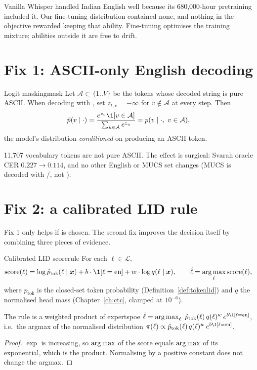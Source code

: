 \begin{intuition}
Vanilla Whisper handled Indian English well because its 680{,}000-hour pretraining included it. Our fine-tuning distribution
contained none, and nothing in the objective rewarded keeping that ability. Fine-tuning optimises the training mixture; abilities
outside it are free to drift.
\end{intuition}

\section{Fix 1: ASCII-only English decoding}

\begin{definition}{Logit masking}{mask}
Let $\mathcal A\subset\{1..V\}$ be the tokens whose decoded string is pure ASCII. When decoding with , set $z_{t,v}=-\infty$ for
$v\notin\mathcal A$ at every step. Then
\[
\tilde p(v\mid\cdot)=\frac{e^{z_v}\1[v\in\mathcal A]}{\sum_{u\in\mathcal A}e^{z_u}}=p(v\mid\cdot,\ v\in\mathcal A),
\]
the model's distribution \emph{conditioned} on producing an ASCII token.
\end{definition}

11{,}707 vocabulary tokens are not pure ASCII. The effect is surgical: Svarah oracle CER $0.227\to\mathbf{0.114}$, and no other English
or MUCS set changes (MUCS is decoded with /, not ).

\section{Fix 2: a calibrated LID rule}

Fix 1 only helps if  is chosen. The second fix improves the decision itself by combining three pieces of evidence.

\begin{definition}{Calibrated LID score}{rule}
For each $\ell\in\mathcal L$,
\[
\mathrm{score}(\ell)=\log\hat p_{\text{tok}}(\ell\mid\vx)+b\cdot\1[\ell=\text{en}]+w\cdot\log q(\ell\mid\vx),\qquad
\hat\ell=\argmax_\ell\mathrm{score}(\ell),
\]
where $\hat p_{\text{tok}}$ is the closed-set token probability (Definition~\ref{def:tokenlid}) and $q$ the normalised head mass
(Chapter~\ref{ch:ctc}, clamped at $10^{-6}$).
\end{definition}

\begin{proposition}{The rule is a weighted product of experts}{poe}
$\hat\ell=\argmax_\ell\ \hat p_{\text{tok}}(\ell)\,q(\ell)^{w}\,e^{b\1[\ell=\text{en}]}$, i.e.\ the argmax of the normalised
distribution $\pi(\ell)\propto\hat p_{\text{tok}}(\ell)\,q(\ell)^w\,e^{b\1[\ell=\text{en}]}$.
\end{proposition}
\begin{proof}
$\exp$ is increasing, so $\operatorname*{arg\,max}$ of the score equals $\operatorname*{arg\,max}$ of its exponential, which is the product. Normalising by a positive
constant does not change the argmax.
\end{proof}

